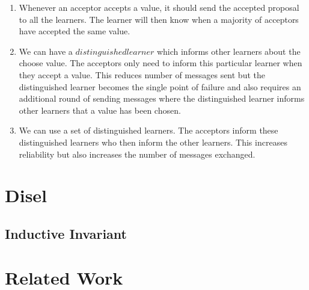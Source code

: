 \begin{enumerate}
  \item Whenever an acceptor accepts a value, it should send the accepted proposal
    to all the learners. The learner will then know when a majority of acceptors
    have accepted the same value.
  \item We can have a $distinguished learner$ which informs other learners about
    the choose value. The acceptors only need to inform this particular learner
    when they accept a value. This reduces number of messages sent but the
    distinguished learner becomes the single point of failure and also requires
    an additional round of sending messages where the distinguished learner informs
    other learners that a value has been chosen.
  \item We can use a set of distinguished learners. The acceptors inform these
    distinguished learners who then inform the other learners. This increases
    reliability but also increases the number of messages exchanged.
\end{enumerate}


\section{Disel}

\subsection{Inductive Invariant}


\section{Related Work}
